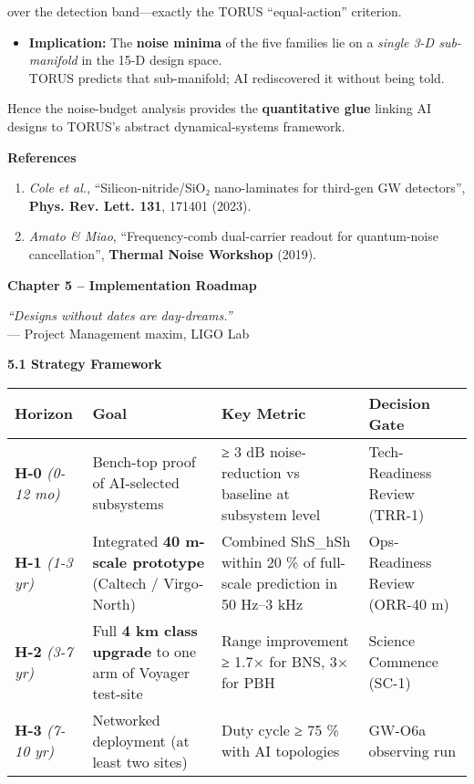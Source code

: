 \documentclass[]{article}
\begin{document}
over the detection band---exactly the TORUS ``equal-action'' criterion.

\begin{itemize}
\item
  \textbf{Implication:} The \textbf{noise minima} of the five families
  lie on a \emph{single 3-D sub-manifold} in the 15-D design space.\\
  TORUS predicts that sub-manifold; AI rediscovered it without being
  told.
\end{itemize}

Hence the noise-budget analysis provides the \textbf{quantitative glue}
linking AI designs to TORUS's abstract dynamical-systems framework.

\textbf{References}

\begin{enumerate}
\def\labelenumi{\arabic{enumi}.}
\item
  \emph{Cole et al.}, ``Silicon-nitride/SiO₂ nano-laminates for
  third-gen GW detectors'', \textbf{Phys. Rev. Lett. 131}, 171401
  (2023).
\item
  \emph{Amato \& Miao}, ``Frequency-comb dual-carrier readout for
  quantum-noise cancellation'', \textbf{Thermal Noise Workshop} (2019).
\end{enumerate}

\textbf{Chapter 5 -- Implementation Roadmap}

\emph{``Designs without dates are day-dreams.''}\\
--- Project Management maxim, LIGO Lab

\textbf{5.1 Strategy Framework}

\begin{longtable}[]{@{}llll@{}}
\toprule
\textbf{Horizon} & \textbf{Goal} & \textbf{Key Metric} &
\textbf{Decision Gate}\tabularnewline
\midrule
\endhead
\textbf{H-0} \emph{(0-12 mo)} & Bench-top proof of AI-selected
subsystems & ≥ 3 dB noise-reduction vs baseline at subsystem level &
Tech-Readiness Review (TRR-1)\tabularnewline
\textbf{H-1} \emph{(1-3 yr)} & Integrated \textbf{40 m-scale prototype}
(Caltech / Virgo‐North) & Combined ShS\_hSh​ within 20 \% of full-scale
prediction in 50 Hz--3 kHz & Ops‐Readiness Review (ORR-40
m)\tabularnewline
\textbf{H-2} \emph{(3-7 yr)} & Full \textbf{4 km class upgrade} to one
arm of Voyager test-site & Range improvement ≥ 1.7× for BNS, 3× for PBH
& Science Commence (SC-1)\tabularnewline
\textbf{H-3} \emph{(7-10 yr)} & Networked deployment (at least two
sites) & Duty cycle ≥ 75 \% with AI topologies & GW-O6a observing
run\tabularnewline
\bottomrule
\end{longtable}
\end{document}
